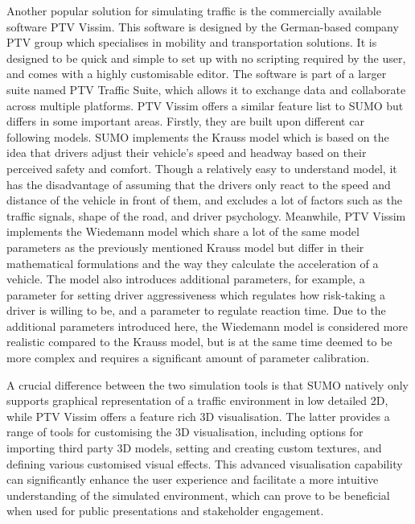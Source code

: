         Another popular solution for simulating traffic is the commercially available software PTV Vissim. This software is designed by the German-based company PTV group which specialises in mobility and transportation solutions. It is designed to be quick and simple to set up with no scripting required by the user, and comes with a highly customisable editor. The software is part of a larger suite named PTV Traffic Suite, which allows it to exchange data and collaborate across multiple platforms. PTV Vissim offers a similar feature list to SUMO but differs in some important areas. Firstly, they are built upon different car following models. SUMO implements the Krauss model which is based on the idea that drivers adjust their vehicle’s speed and headway based on their perceived safety and comfort. Though a relatively easy to understand model, it has the disadvantage of assuming that the drivers only react to the speed and distance of the vehicle in front of them, and excludes a lot of factors such as the traffic signals, shape of the road, and driver psychology. Meanwhile, PTV Vissim implements the Wiedemann model\cite{ahmed2021} which share a lot of the same model parameters as the previously mentioned Krauss model but differ in their mathematical formulations and the way they calculate the acceleration of a vehicle. The model also introduces additional parameters, for example, a parameter for setting driver aggressiveness which regulates how risk-taking a driver is willing to be, and a parameter to regulate reaction time. Due to the additional parameters introduced here, the Wiedemann model is considered more realistic compared to the Krauss model, but is at the same time deemed to be more complex and requires a significant amount of parameter calibration.

        A crucial difference between the two simulation tools is that SUMO natively only supports graphical representation of a traffic environment in low detailed 2D, while PTV Vissim offers a feature rich 3D visualisation. The latter provides a range of tools for customising the 3D visualisation, including options for importing third party 3D models, setting and creating custom textures, and defining various customised visual effects. This advanced visualisation capability can significantly enhance the user experience and facilitate a more intuitive understanding of the simulated environment, which can prove to be beneficial when used for public presentations and stakeholder engagement. 
